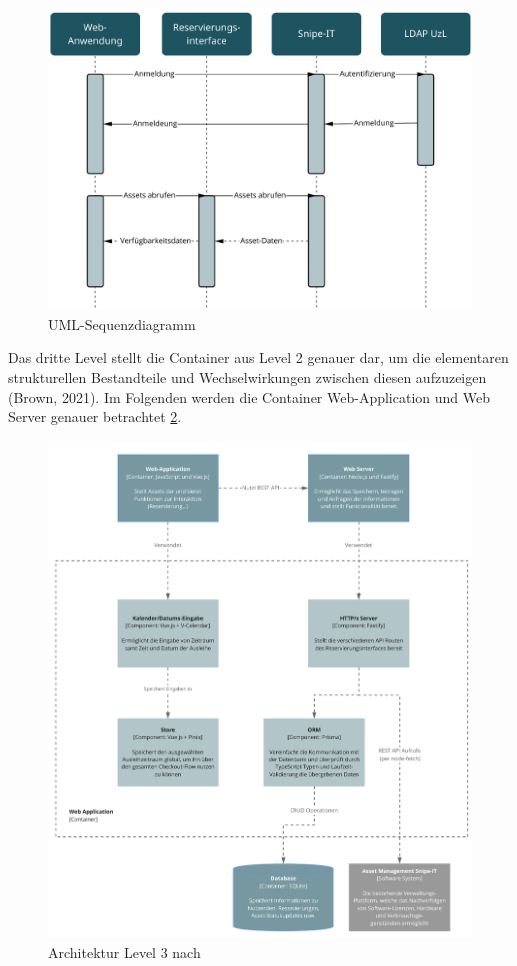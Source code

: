 \begin{figure}[h]
    \centering
    \includegraphics[scale=0.45]{Bilder/uml.pdf}
    \caption[UML-Sequenzdiagramm]{UML-Sequenzdiagramm}
    \label{fig:uml}
\end{figure}

{\sffamily\color{maincolor}{Level 3: Components}}

Das dritte Level stellt die Container aus Level 2 genauer dar, um die elementaren strukturellen
Bestandteile und Wechselwirkungen zwischen diesen aufzuzeigen (Brown, 2021). Im Folgenden werden die
Container Web-Application und Web Server genauer betrachtet \ref{fig:level3}.

\begin{figure}[h]
    \centering
    \includegraphics[scale=0.9]{Bilder/level3.pdf}
    \caption[Architektur Level 3]{Architektur Level 3 nach }
    \label{fig:level3}
\end{figure}

